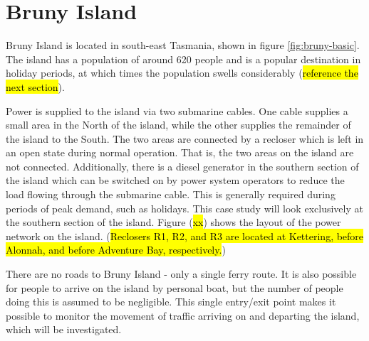 \section{Bruny Island}
Bruny Island is located in south-east Tasmania, shown in figure \ref{fig:bruny-basic}.
The island has a population of around 620 people and is a popular destination in holiday periods, at which times the population swells considerably (\hl{reference the next section}).
\par
Power is supplied to the island via two submarine cables.
One cable supplies a small area in the North of the island, while the other supplies the remainder of the island to the South.
The two areas are connected by a recloser which is left in an open state during normal operation.
That is, the two areas on the island are not connected.
Additionally, there is a diesel generator in the southern section of the island which can be switched on by power system operators to reduce the load flowing through the submarine cable.
This is generally required during periods of peak demand, such as holidays.
This case study will look exclusively at the southern section of the island.
Figure (\hl{xx}) shows the layout of the power network on the island.
(\hl{Reclosers R1, R2, and R3 are located at Kettering, before Alonnah, and before Adventure Bay, respectively.})

There are no roads to Bruny Island - only a single ferry route.
It is also possible for people to arrive on the island by personal boat, but the number of people doing this is assumed to be negligible.
This single entry/exit point makes it possible to monitor the movement of traffic arriving on and departing the island, which will be investigated.



